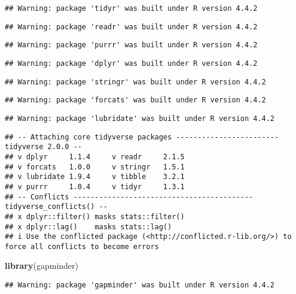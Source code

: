 \documentclass[
]{article}
\newenvironment{Shaded}{\begin{snugshade}}{\end{snugshade}}
\newcommand{\FunctionTok}[1]{\textcolor[rgb]{0.13,0.29,0.53}{\textbf{#1}}}
\newcommand{\NormalTok}[1]{#1}
\begin{document}
\begin{verbatim}
## Warning: package 'tidyr' was built under R version 4.4.2
\end{verbatim}

\begin{verbatim}
## Warning: package 'readr' was built under R version 4.4.2
\end{verbatim}

\begin{verbatim}
## Warning: package 'purrr' was built under R version 4.4.2
\end{verbatim}

\begin{verbatim}
## Warning: package 'dplyr' was built under R version 4.4.2
\end{verbatim}

\begin{verbatim}
## Warning: package 'stringr' was built under R version 4.4.2
\end{verbatim}

\begin{verbatim}
## Warning: package 'forcats' was built under R version 4.4.2
\end{verbatim}

\begin{verbatim}
## Warning: package 'lubridate' was built under R version 4.4.2
\end{verbatim}

\begin{verbatim}
## -- Attaching core tidyverse packages ------------------------ tidyverse 2.0.0 --
## v dplyr     1.1.4     v readr     2.1.5
## v forcats   1.0.0     v stringr   1.5.1
## v lubridate 1.9.4     v tibble    3.2.1
## v purrr     1.0.4     v tidyr     1.3.1
## -- Conflicts ------------------------------------------ tidyverse_conflicts() --
## x dplyr::filter() masks stats::filter()
## x dplyr::lag()    masks stats::lag()
## i Use the conflicted package (<http://conflicted.r-lib.org/>) to force all conflicts to become errors
\end{verbatim}

\begin{Shaded}
\begin{Highlighting}[]
\FunctionTok{library}\NormalTok{(gapminder)}
\end{Highlighting}
\end{Shaded}

\begin{verbatim}
## Warning: package 'gapminder' was built under R version 4.4.2
\end{verbatim}
\end{document}
